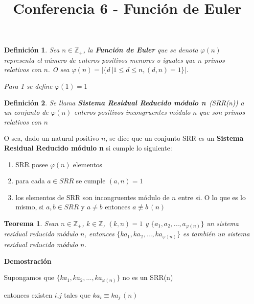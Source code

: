 \documentclass[a4paper,12pt]{report}
\title{Conferencia 6 - Función de Euler}
\author{}
\newtheorem*{teo}{Teorema}
\newtheorem*{dfn}{Definición}
\begin{document}
\maketitle


 
 \begin{dfn}
  Sea $n\in \mathbb{Z}_+$, la \textbf{Función de Euler} que se denota $\varphi(n)$ representa el número de enteros positivos menores o iguales que $n$ primos relativos con $n$. O sea $\varphi(n)=|\{d\, |1\leq d \leq n,(d,n)=1\}|$. 
  
  Para 1 se define $\varphi(1)=1$
 \end{dfn}
 
 \begin{dfn}
  Se llama \textbf{Sistema Residual Reducido módulo n}~(SRR(n)) a un conjunto de $\varphi(n)$ enteros positivos incongruentes módulo $n$ que son primos relativos con $n$
 \end{dfn}
 
 O sea, dado un natural positivo $n$, se dice que un conjunto SRR es un \textbf{Sistema Residual Reducido módulo n} si cumple lo siguiente:
 
 \begin{enumerate}
  \item SRR posee $\varphi(n)$ elementos
  \item para cada $a\in SRR$ se cumple $(a,n)=1$
  \item los elementos de SRR son incongruentes módulo de $n$ entre si. O lo que es lo mismo,  si $a,b\in SRR$ y $a\neq b$ entonces $a\not\equiv b \, (n)$
 \end{enumerate}

 
\begin{teo}
 Sean $n\in\mathbb{Z}_+$, $k\in\mathbb{Z}$, $(k,n)=1$ y $\{a_1,a_2,\dots,a_{\varphi(n)}\}$ un sistema residual reducido módulo $n$, entonces $\{ka_1,ka_2,\dots,ka_{\varphi(n)}\}$ es también un sistema residual reducido módulo $n$.
\end{teo}

\textbf{Demostración}


Supongamos que $\{ka_1,ka_2,\dots,ka_{\varphi(n)}\}$ no es un SRR(n)

entonces existen $i$,$j$ tales que $ka_i\equiv ka_j \, (n)$
\end{document}
